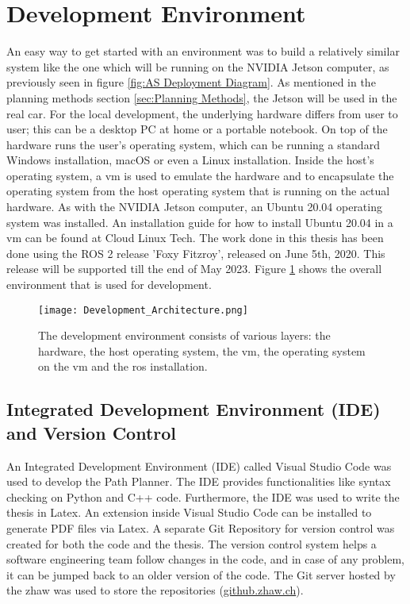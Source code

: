 \section{Development Environment} \label{sec:Development Environment}
An easy way to get started with an environment was to build a relatively similar system like the one which will be running on the NVIDIA Jetson computer, as previously seen in figure \ref{fig:AS Deployment Diagram}. As mentioned in the planning methods section \ref{sec:Planning Methods}, the Jetson will be used in the real car.
For the local development, the underlying hardware differs from user to user; this can be a desktop PC at home or a portable notebook. On top of the hardware runs the user's operating system, which can be running a standard Windows installation, macOS or even a Linux installation. Inside the host's operating system, a \acrlong{vm} is used to emulate the hardware and to encapsulate the operating system from the host operating system that is running on the actual hardware. As with the NVIDIA Jetson computer, an Ubuntu 20.04 operating system was installed. An installation guide for how to install Ubuntu 20.04 in a \acrshort{vm} can be found at Cloud Linux Tech. \cite{cloudlinuxtech_install_ubuntu_2004} The work done in this thesis has been done using the ROS 2 release 'Foxy Fitzroy', released on June 5th, 2020. This release will be supported till the end of May 2023. \cite{ros2_releases_and_target_platforms}
Figure \ref{fig:Development Environment} shows the overall environment that is used for development.
\begin{figure}[H]
    \centering
    \texttt{[image: Development\_Architecture.png]}
    \caption{The development environment consists of various layers: the hardware, the host operating system, the \acrshort{vm}, the operating system on the \acrshort{vm} and the \acrshort{ros} installation.}
    \label{fig:Development Environment}
\end{figure}

\subsection{Integrated Development Environment (IDE) and Version Control} \label{sec:Integrated Development Environment (IDE) and Version Control}
An Integrated Development Environment (IDE) called Visual Studio Code was used to develop the Path Planner. The IDE provides functionalities like syntax checking on Python and C++ code. Furthermore, the IDE was used to write the thesis in Latex. An extension inside Visual Studio Code can be installed to generate PDF files via Latex. A separate Git Repository for version control was created for both the code and the thesis. The version control system helps a software engineering team follow changes in the code, and in case of any problem, it can be jumped back to an older version of the code. The Git server hosted by the \acrshort{zhaw} was used to store the repositories (\href{https://github.zhaw.ch}{github.zhaw.ch}).

